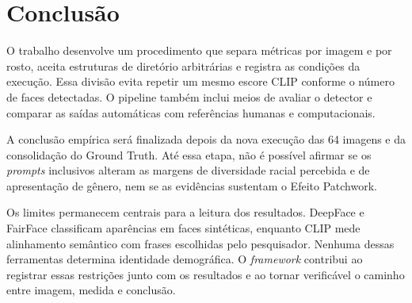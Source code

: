 \chapter{Conclusão}
\label{cap:conclusao}

O trabalho desenvolve um procedimento que separa métricas por imagem e por rosto, aceita estruturas de diretório arbitrárias e registra as condições da execução. Essa divisão evita repetir um mesmo escore CLIP conforme o número de faces detectadas. O pipeline também inclui meios de avaliar o detector e comparar as saídas automáticas com referências humanas e computacionais.

A conclusão empírica será finalizada depois da nova execução das 64 imagens e da consolidação do Ground Truth. Até essa etapa, não é possível afirmar se os \textit{prompts} inclusivos alteram as margens de diversidade racial percebida e de apresentação de gênero, nem se as evidências sustentam o Efeito Patchwork.

Os limites permanecem centrais para a leitura dos resultados. DeepFace e FairFace classificam aparências em faces sintéticas, enquanto CLIP mede alinhamento semântico com frases escolhidas pelo pesquisador. Nenhuma dessas ferramentas determina identidade demográfica. O \textit{framework} contribui ao registrar essas restrições junto com os resultados e ao tornar verificável o caminho entre imagem, medida e conclusão.
